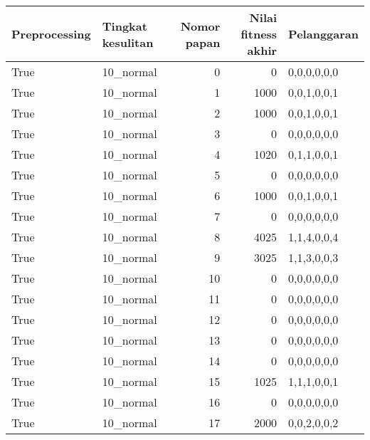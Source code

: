 \begin{tabular}{llrrl}
\hline
 Preprocessing   & Tingkat kesulitan   &   Nomor papan &   Nilai fitness akhir & Pelanggaran   \\
\hline
 True            & 10\_normal           &             0 &                     0 & 0,0,0,0,0,0   \\
 True            & 10\_normal           &             1 &                  1000 & 0,0,1,0,0,1   \\
 True            & 10\_normal           &             2 &                  1000 & 0,0,1,0,0,1   \\
 True            & 10\_normal           &             3 &                     0 & 0,0,0,0,0,0   \\
 True            & 10\_normal           &             4 &                  1020 & 0,1,1,0,0,1   \\
 True            & 10\_normal           &             5 &                     0 & 0,0,0,0,0,0   \\
 True            & 10\_normal           &             6 &                  1000 & 0,0,1,0,0,1   \\
 True            & 10\_normal           &             7 &                     0 & 0,0,0,0,0,0   \\
 True            & 10\_normal           &             8 &                  4025 & 1,1,4,0,0,4   \\
 True            & 10\_normal           &             9 &                  3025 & 1,1,3,0,0,3   \\
 True            & 10\_normal           &            10 &                     0 & 0,0,0,0,0,0   \\
 True            & 10\_normal           &            11 &                     0 & 0,0,0,0,0,0   \\
 True            & 10\_normal           &            12 &                     0 & 0,0,0,0,0,0   \\
 True            & 10\_normal           &            13 &                     0 & 0,0,0,0,0,0   \\
 True            & 10\_normal           &            14 &                     0 & 0,0,0,0,0,0   \\
 True            & 10\_normal           &            15 &                  1025 & 1,1,1,0,0,1   \\
 True            & 10\_normal           &            16 &                     0 & 0,0,0,0,0,0   \\
 True            & 10\_normal           &            17 &                  2000 & 0,0,2,0,0,2   \\

\end{tabular}
